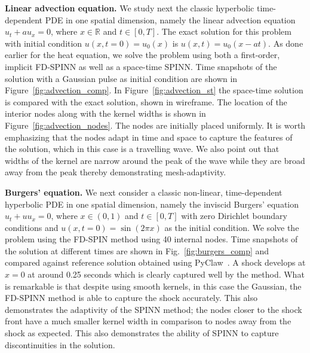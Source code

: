 \documentclass[12pt]{article}
\begin{document}
\textbf{Linear advection equation.}
We study next the classic hyperbolic time-dependent PDE in one spatial dimension, namely the linear advection equation $u_t + au_x = 0$, where $x\in \mathbb{R}$ and $t\in [0, T]$.  The exact solution for this problem with  initial condition $u(x, t=0) = u_0(x)$ is $u(x, t) = u_0(x - at)$. As done earlier for the heat equation, we solve the problem using both a first-order, implicit FD-SPINN as well as a space-time SPINN.  Time snapshots of the solution with a Gaussian pulse as initial condition are shown in Figure~\ref{fig:advection_comp}.  In Figure~\ref{fig:advection_st} the space-time solution is compared with the exact solution, shown in wireframe.  The location of the interior nodes along with the kernel widths is shown in Figure~\ref{fig:advection_nodes}.  The nodes are initially placed uniformly. It is worth emphasizing that the nodes adapt in time and space to capture the features of the solution, which in this case is a travelling wave.  We also point out that widths of the kernel are narrow around the peak of the wave while they are broad away from the peak thereby demonstrating mesh-adaptivity.


\textbf{Burgers' equation.}
We next consider a classic non-linear, time-dependent hyperbolic PDE in one spatial dimension, namely the inviscid Burgers' equation $u_t + u u_x = 0$, where $x\in (0, 1)$ and $t\in [0, T]$ with zero Dirichlet boundary conditions and $u(x, t=0) = \sin(2\pi x)$ as the initial condition.  We solve the problem using the FD-SPIN method using 40 internal nodes.  Time snapshots of the solution at different times are shown in Fig.~\ref{fig:burgers_comp}  and compared against reference solution obtained using PyClaw~\cite{pyclaw}.  A shock develops at $x=0$ at around 0.25 seconds which is clearly captured well by the method.  What is remarkable is that despite using smooth kernels, in this case the Gaussian, the FD-SPINN method is able to capture the shock accurately.  This also demonstrates the adaptivity of the SPINN method; the nodes closer to the shock front have a much smaller kernel width in comparison to nodes away from the shock as expected.  This also demonstrates the ability of SPINN to capture discontinuities in the solution.
\end{document}
